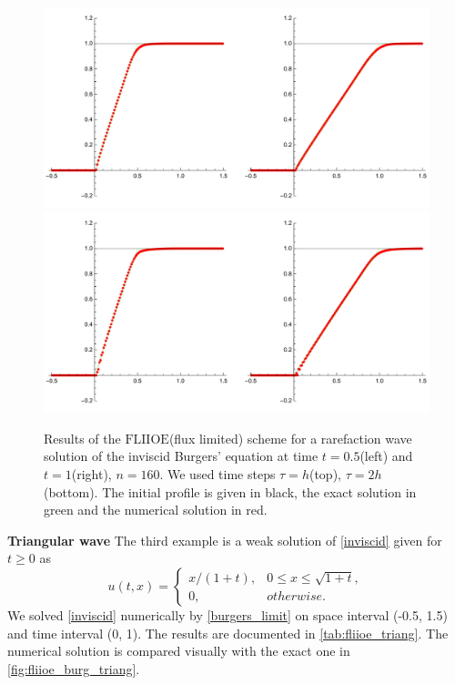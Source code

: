 \documentclass[../include.tex]{subfiles}
\begin{document}
\begin{figure}[H]
	\centering
	\includegraphics[width=\textwidth]{figures/inviscidRare160c1.pdf}
	\includegraphics[width=\textwidth]{figures/inviscidRare160c2.pdf}
	\caption{Results of the $\mathrm{FLIIOE}$(flux limited) scheme for a rarefaction wave solution of the inviscid Burgers' equation at time $ t=0.5 $(left) and $ t=1 $(right), $ n=160 $. We used time steps $ \tau=h $(top), $ \tau=2h $(bottom). The initial profile is given in black, the exact solution in green and the numerical solution in red.}
	\label{fig:fliioe_shock_rare}
\end{figure}
\newpage
\textbf{Triangular wave}
The third example is a weak solution of \eqref{inviscid} \cite{olv, lev, whitham} given for $ t\geq0 $ as
\begin{equation}
	u(t,x) =
	\begin{cases}
		x/(1+t), &0 \leq x \leq \sqrt{1+t},\nonumber\\
		0, &otherwise.\nonumber
	\end{cases}
\end{equation}
We solved \eqref{inviscid} numerically by \eqref{burgers_limit} on space interval (-0.5, 1.5) and time interval (0, 1). The results are documented in \ref{tab:fliioe_triang}. The numerical solution is compared visually with the exact one in \ref{fig:fliioe_burg_triang}.
\end{document}
